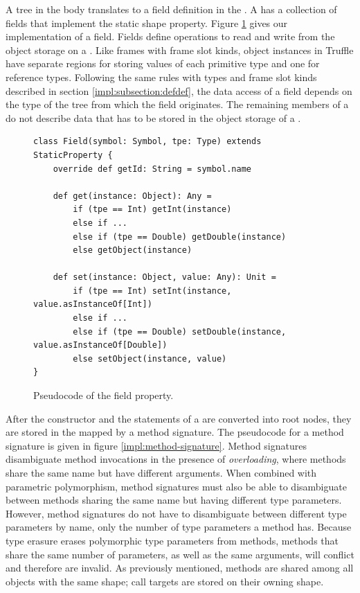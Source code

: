 A  tree in the  body translates to a field definition in the .
A  has a collection of fields that implement the static shape property.
Figure \ref{impl:field} gives our implementation of a field.
Fields define operations to read and write from the object storage on a .
Like frames with frame slot kinds, object instances in Truffle have separate regions for storing values of each primitive type and one for reference types.
Following the same rules with types and frame slot kinds described in section \ref{impl:subsection:defdef}, the data access of a field depends on the type of the  tree from which the field originates.
The remaining members of a  do not describe data that has to be stored in the object storage of a .

\begin{figure}[!htb]
\begin{verbatim}
class Field(symbol: Symbol, tpe: Type) extends StaticProperty {
	override def getId: String = symbol.name
	
	def get(instance: Object): Any = 
		if (tpe == Int) getInt(instance)
		else if ...
		else if (tpe == Double) getDouble(instance)
		else getObject(instance)
	
	def set(instance: Object, value: Any): Unit = 
		if (tpe == Int) setInt(instance, value.asInstanceOf[Int])
		else if ...
		else if (tpe == Double) setDouble(instance, value.asInstanceOf[Double])
		else setObject(instance, value)	
} 
\end{verbatim}
\caption{Pseudocode of the field property.}
\label{impl:field}
\end{figure}

After the constructor and the  statements of a  are converted into root nodes, they are stored in the  mapped by a method signature.
The pseudocode for a method signature is given in figure \ref{impl:method-signature}.
Method signatures disambiguate method invocations in the presence of \textit{overloading}\cite{strachey:fundamental-concepts}, where methods share the same name but have different arguments.
When combined with parametric polymorphism, method signatures must also be able to disambiguate between methods sharing the same name but having different type parameters.
However, method signatures do not have to disambiguate between different type parameters by name, only the number of type parameters a method has.
Because type erasure erases polymorphic type parameters from methods, methods that share the same number of parameters, as well as the same arguments, will conflict and therefore are invalid.
As previously mentioned, methods are shared among all  objects with the same shape; call targets are stored on their owning shape.

